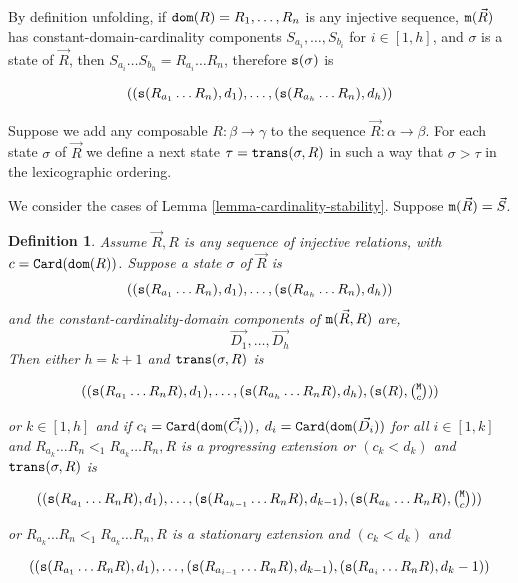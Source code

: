 \documentclass{lmcs}
\newtheorem{definition}[theorem]{Definition}
\begin{document}
By definition unfolding, if ${\tt dom}(R)=R_1, \ldots, R_n$ is any injective sequence, 
${\tt m}(\vec{R})$ has constant-domain-cardinality components  
$S_{a_i},\ldots, S_{b_i}$ for $i \in [1,h]$, and $\sigma$
is a state of $\vec{R}$, then $S_{a_i}\ldots S_{b_h} = R_{a_i}\ldots R_{n}$,
therefore ${\tt s}(\sigma)$ is

$$
(
({\tt s}(R_{a_1}\ldots R_{n}), d_1), 
\ldots,
({\tt s}(R_{a_h}\ldots R_{n}), d_h)
)
$$

Suppose we add any composable 
$R : \beta \rightarrow \gamma$ 
to the sequence $\vec{R}:\alpha \rightarrow \beta$. For each state $\sigma$ of 
$\vec{R}$ we define a next state $\tau = {\tt trans}(\sigma,R)$ in such a way
that $\sigma > \tau$ in the lexicographic ordering.

We consider the cases of Lemma \ref{lemma-cardinality-stability}. 
Suppose ${\tt m}(\vec{R}) = \vec{S}$.

\begin{definition}
\label{definition-transition}
Assume $\vec{R}, R$ is any sequence of injective relations, with $c = {\tt Card}({\tt dom}(R))$. 
Suppose a state $\sigma$ of $\vec{R}$ is
$$
(
({\tt s}(R_{a_1}\ldots R_{n}), d_1), 
\ldots,
({\tt s}(R_{a_h}\ldots R_{n}), d_h)
)
$$ 
 and the constant-cardinality-domain components of
${\tt m}(\vec{R}, R)$ are, 
$$
\vec{D_1}, \ldots,\vec{D_h}
$$
Then either $h=k+1$ and ${\tt trans}(\sigma,R)$ is

$$
(
(\size(R_{a_1}\ldots R_{n} R), d_1), 
\ldots,
(\size(R_{a_h}\ldots R_{n} R), d_h),
(\size(R),                                     \newton{\MaxInd}{c})
)
$$ 

or $k \in [1,h]$ and if 
$c_i = {\tt Card}({\tt dom}(\vec{C_i}))$, 
$d_i = {\tt Card}({\tt dom}(\vec{D_i}))$ for all $i \in [1,k]$ 
and $R_{a_k}\ldots R_{n} <_1 R_{a_k}\ldots R_{n}, R$ 
is a progressing extension or $(c_k < d_k)$ and ${\tt trans}(\sigma,R)$ is

$$
(
(\size(R_{a_1}\ldots R_{n} R), d_1), 
\ldots,
(\size(R_{a_{k-1}}\ldots R_{n} R), d_{k-1}),
(\size(R_{a_k}\ldots R_{n} R), \newton{\MaxInd}{c})
)
$$ 

or $R_{a_k}\ldots R_{n} <_1 R_{a_k}\ldots R_{n}, R$ is a stationary extension and 
$(c_k < d_k)$ and

$$
(
({\tt s}(R_{a_1}\ldots R_{n} R),         d_1), 
\ldots,
({\tt s}(R_{a_{i-1}}\ldots R_{n} R),  d_{k-1}),
({\tt s}(R_{a_{i}}\ldots R_{n} R),     d_k -1)
)
$$ 

\end{definition}
\end{document}
